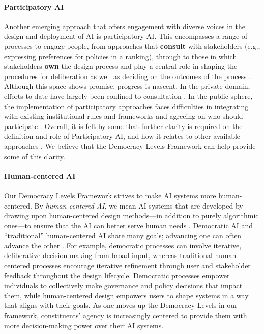 \documentclass{article}
\begin{document}
\paragraph{Participatory AI}

    Another emerging approach that offers engagement with diverse voices in the design and deployment of AI is participatory AI. This encompasses a range of processes to engage people, from approaches that \textbf{consult} with stakeholders (e.g., expressing preferences for policies in a ranking), through to those in which stakeholders \textbf{own} the design process and play a central role in shaping the procedures for deliberation as well as deciding on the outcomes of the process \cite{delgado2023}. Although this space shows promise, progress is nascent. In the private domain, efforts to date have largely been confined to consultation \cite{groves2023going}. In the public sphere, the implementation of participatory approaches faces difficulties in integrating with existing institutional rules and frameworks and agreeing on who should participate \cite{wong2022key}. Overall, it is felt by some that further clarity is required on the definition and role of Participatory AI, and how it relates to other available approaches \cite{birhane2022}. We believe that the Democracy Levels Framework can help provide some of this clarity.

\paragraph{Human-centered AI}

    Our Democracy Levels Framework strives to make AI systems more human-centered. By \textit{human-centered AI}, we mean AI systems that are developed by drawing upon human-centered design methods---in addition to purely algorithmic ones---to ensure that the AI can better serve human needs \cite{shneiderman2022human, shneiderman2020human, riedl2019human, capel2023human, auernhammer2020human}. Democratic AI and ``traditional'' human-centered AI share many goals; advancing one can often advance the other \cite{sigfrids2023}. For example, democratic processes can involve iterative, deliberative decision-making from broad input, whereas traditional human-centered processes encourage iterative refinement through user and stakeholder feedback throughout the design lifecycle. Democratic processes empower individuals to collectively make governance and policy decisions that impact them, while human-centered design empowers users to shape systems in a way that aligns with their goals. As one moves up the Democracy Levels in our framework, constituents' agency is increasingly centered to provide them with more decision-making power over their AI systems.
\end{document}
